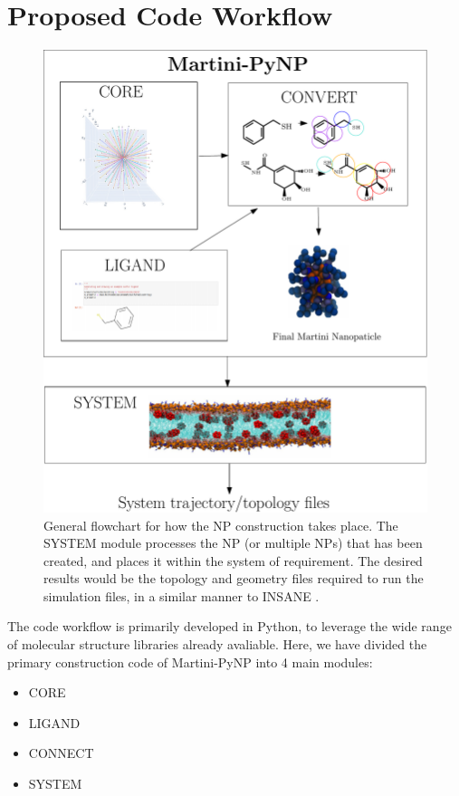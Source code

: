\documentclass[12pt]{article}
\begin{document}
\section{Proposed Code Workflow}
\begin{figure} %
  \centering
  \includegraphics[scale=0.4]{schema.pdf}
  \caption{General flowchart for how the NP construction takes place. The SYSTEM module processes the NP (or multiple NPs) that has been created, and places it within the system of requirement. The desired results would be the topology and geometry files required to run the simulation files, in a similar manner to INSANE \cite{INSANE}.}
\end{figure}
The code workflow is primarily developed in Python, to leverage the wide range of molecular structure libraries already avaliable. Here, we have divided the
primary construction code of Martini-PyNP into 4 main modules: 
\begin{itemize}
\item CORE
\item LIGAND
\item CONNECT
\item SYSTEM 
\end{itemize}
\end{document}
